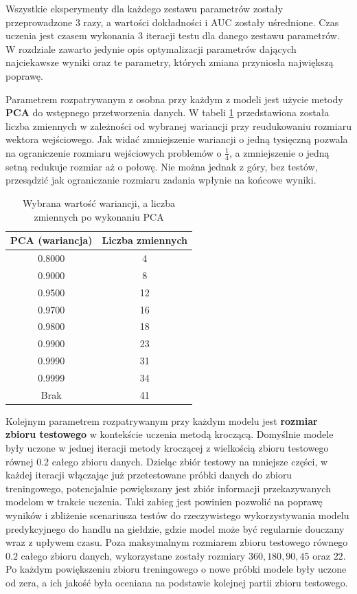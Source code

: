 \documentclass[a4paper, twoside, 11pt, openright]{article}
\begin{document}
Wszystkie eksperymenty dla każdego zestawu parametrów zostały przeprowadzone 3 razy, a wartości dokładności i AUC zostały uśrednione. Czas uczenia jest czasem wykonania 3 iteracji testu dla danego zestawu parametrów. W rozdziale zawarto jedynie opis optymalizacji parametrów dających najciekawsze wyniki oraz te parametry, których zmiana przyniosła największą poprawę.

\bigskip

Parametrem rozpatrywanym z osobna przy każdym z modeli jest użycie metody \textbf{PCA} do wstępnego przetworzenia danych. W tabeli \ref{tab:pca_component_number} przedstawiona została liczba zmiennych w zależności od wybranej wariancji przy reudukowaniu rozmiaru wektora wejściowego. Jak widać zmniejszenie wariancji o jedną tysięczną pozwala na ograniczenie rozmiaru wejściowych problemów o $\frac{1}{4}$, a zmniejszenie o jedną setną redukuje rozmiar aż o połowę. Nie można jednak z góry, bez testów, przesądzić jak ograniczanie rozmiaru zadania wpłynie na końcowe wyniki. 


\begin{table}[H]
    \centering
    \begin{tabular}{|c|c|}
    \hline
        \textbf{PCA (wariancja)} & \textbf{Liczba zmiennych} \\ \hline
        0.8000 & 4 \\ \hline 
        0.9000 & 8 \\ \hline 
        0.9500 & 12 \\ \hline 
        0.9700 & 16 \\ \hline 
        0.9800 & 18 \\ \hline 
        0.9900 & 23 \\ \hline
        0.9990 & 31 \\ \hline 
        0.9999 & 34 \\ \hline 
        Brak & 41 \\ \hline 
    \end{tabular}
    \caption{Wybrana wartość wariancji, a liczba zmiennych po wykonaniu PCA}
    \label{tab:pca_component_number}
\end{table}

\bigskip

Kolejnym parametrem rozpatrywanym przy każdym modelu jest \textbf{rozmiar zbioru testowego} w kontekście uczenia metodą kroczącą. Domyślnie modele były uczone w jednej iteracji metody kroczącej z wielkością zbioru testowego równej $0.2$ całego zbioru danych. Dzieląc zbiór testowy na mniejsze części, w każdej iteracji włączając już przetestowane próbki danych do zbioru treningowego, potencjalnie powiększany jest zbiór informacji przekazywanych modelom w trakcie uczenia. Taki zabieg jest powinien pozwolić na poprawę wyników i zbliżenie scenariusza testów do rzeczywistego wykorzystywania modelu predykcyjnego do handlu na giełdzie, gdzie model może być regularnie douczany wraz z upływem czasu. Poza maksymalnym rozmiarem zbioru testowego równego $0.2$ całego zbioru danych, wykorzystane zostały rozmiary $360, 180, 90, 45$ oraz $22$. Po każdym powiększeniu zbioru treningowego o nowe próbki modele były uczone od zera, a ich jakość była oceniana na podstawie kolejnej partii zbioru testowego.
\end{document}
